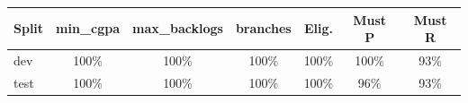 \begin{tabular}{lcccccc}
\toprule
Split & min\_cgpa & max\_backlogs & branches & Elig. & Must P & Must R \\
\midrule
dev & 100\% & 100\% & 100\% & 100\% & 100\% & 93\% \\
test & 100\% & 100\% & 100\% & 100\% & 96\% & 93\% \\
\bottomrule
\end{tabular}
